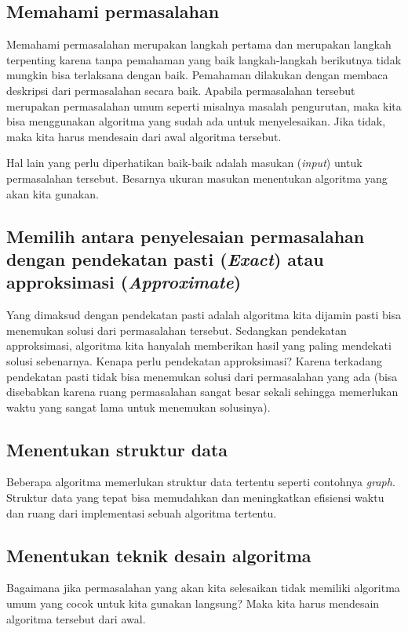 \subsection{Memahami permasalahan}
Memahami permasalahan merupakan langkah pertama dan merupakan langkah terpenting karena tanpa pemahaman yang baik langkah-langkah berikutnya tidak mungkin bisa terlaksana dengan baik. Pemahaman dilakukan dengan membaca deskripsi dari permasalahan secara baik. Apabila permasalahan tersebut merupakan permasalahan umum seperti misalnya masalah pengurutan, maka kita bisa menggunakan algoritma yang sudah ada untuk menyelesaikan. Jika tidak, maka kita harus mendesain dari awal algoritma tersebut.

Hal lain yang perlu diperhatikan baik-baik adalah masukan (\textit{input}) untuk permasalahan tersebut. Besarnya ukuran masukan menentukan algoritma yang akan kita gunakan. 

\subsection{Memilih antara penyelesaian permasalahan dengan pendekatan pasti (\textit{Exact}) atau approksimasi (\textit{Approximate})}
Yang dimaksud dengan pendekatan pasti adalah algoritma kita dijamin pasti bisa menemukan solusi dari permasalahan tersebut. Sedangkan pendekatan approksimasi, algoritma kita hanyalah memberikan hasil yang paling mendekati solusi sebenarnya. Kenapa perlu pendekatan approksimasi? Karena terkadang pendekatan pasti tidak bisa menemukan solusi dari permasalahan yang ada (bisa disebabkan karena ruang permasalahan sangat besar sekali sehingga memerlukan waktu yang sangat lama untuk menemukan solusinya).
 

\subsection{Menentukan struktur data}
Beberapa algoritma memerlukan struktur data tertentu seperti contohnya \textit{graph}. Struktur data yang tepat bisa memudahkan dan meningkatkan efisiensi waktu dan ruang dari implementasi sebuah algoritma tertentu. 

\subsection{Menentukan teknik desain algoritma}
Bagaimana jika permasalahan yang akan kita selesaikan tidak memiliki algoritma umum yang cocok untuk kita gunakan langsung? Maka kita harus mendesain algoritma tersebut dari awal. 

